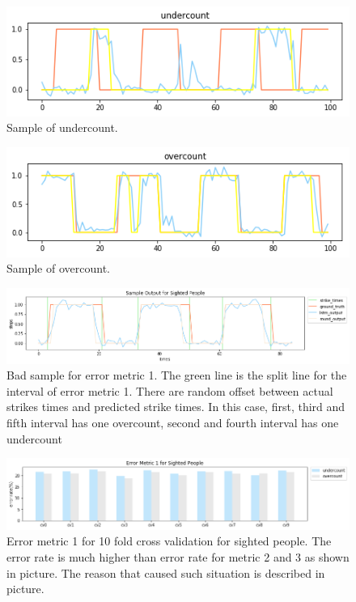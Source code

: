 \documentclass[11pt]{article}
\begin{document}
{\begin{figure}[ht]
\centering
\includegraphics[scale=0.4]{undercount}
\caption{Sample of undercount.}
\label{fig:undercount}
\end{figure}

\begin{figure}[ht]
\centering
\includegraphics[scale=0.4]{overcount}
\caption{Sample of overcount.}
\label{fig:overcount}
\end{figure}


\begin{figure}[ht]
\centering
\includegraphics[scale=0.5]{output_small_metric2}
\caption{Bad sample for error metric 1. The green line is the split line for the interval of error metric 1. There are random offset between actual strikes times and predicted strike times. In this case, first, third and fifth interval has one overcount, second and fourth interval has one undercount}
\label{fig:output_small_metric2}
\end{figure}




\begin{figure}[ht]
\centering
\includegraphics[scale=0.5]{error_metric_1_na_10fold}
\caption{Error metric 1 for 10 fold cross validation for sighted people. The error rate is much higher than error rate for metric 2 and 3 as shown in picture. The reason that caused such situation is described in picture.}
\label{fig:error_metric_1_na_10fold}
\end{figure}


}
\end{document}
